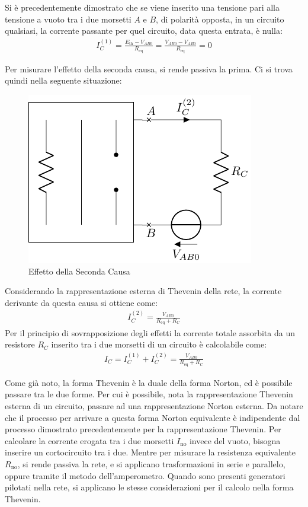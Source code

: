 \documentclass{article}
\numberwithin{equation}{subsection}
\begin{document}
Si è precedentemente dimostrato che se viene inserito una tensione pari alla tensione a vuoto tra i due morsetti $A$ e $B$, di polarità opposta, in un circuito qualsiasi, 
la corrente passante per quel circuito, data questa entrata, è nulla: 
\begin{gather*}
    I_C^{(1)}=\displaystyle\frac{E_\mathrm{th}-V_{AB0}}{R_\mathrm{eq}}=\frac{V_{AB0}-V_{AB0}}{R_\mathrm{eq}}=0
\end{gather*}

Per misurare l'effetto della seconda causa, si rende passiva la prima. Ci si trova quindi nella seguente situazione: 
\begin{figure}[H]%
    \centering
    \includegraphics{seconda-causa-corrente-carico.pdf}%
    \caption{Effetto della Seconda Causa}%
    \label{fig:seconda-causa-corrente-carico}
\end{figure}
Considerando la rappresentazione esterna di Thevenin della rete, la corrente derivante da questa causa si ottiene come:
\begin{gather*}
    I_C^{(2)}=\displaystyle\frac{V_{AB0}}{R_\mathrm{eq}+R_{C}}
\end{gather*}
Per il principio di sovrapposizione degli effetti la corrente totale assorbita da un resistore $R_C$ inserito tra i due morsetti di un circuito è calcolabile come:
\begin{gather*}
    I_C=I_C^{(1)}+I_C^{(2)}=\displaystyle\frac{V_{AB0}}{R_\mathrm{eq}+R_{C}}
\end{gather*}


Come già noto, la forma Thevenin è la duale della forma Norton, ed è possibile passare tra le due forme. Per cui è possibile, nota la rappresentazione Thevenin esterna di 
un circuito, passare ad una rappresentazione Norton esterna. Da notare che il processo per arrivare a questa forma Norton equivalente è indipendente dal 
processo dimostrato precedentemente per la rappresentazione Thevenin. Per calcolare la corrente erogata tra i due morsetti $I_\mathrm{no}$ invece del vuoto, bisogna inserire un 
cortocircuito tra i due. Mentre per misurare la resistenza equivalente $R_\mathrm{no}$, si rende passiva la rete, e si applicano trasformazioni in serie e parallelo, oppure tramite 
il metodo dell'amperometro. Quando sono presenti generatori pilotati nella rete, si applicano le stesse considerazioni per il calcolo nella forma Thevenin. 
\end{document}
